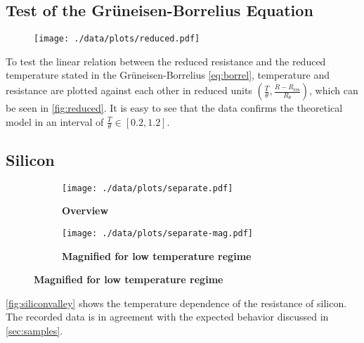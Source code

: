 \subsection{Test of the Grüneisen-Borrelius Equation}
\begin{figure}
	\centering
	\texttt{[image: ./data/plots/reduced.pdf]}
	\label{fig:reduced}
\end{figure}

To test the linear relation between the reduced resistance and the reduced temperature stated in the Grüneisen-Borrelius \autoref{eq:borrel}, temperature and resistance are plotted against each other in reduced units $\left(\frac{T}{\theta}, \frac{R-R_\text{res}}{R_\theta}\right)$, which can be seen in \autoref{fig:reduced}.
It is easy to see that the data confirms the theoretical model in an interval of $\frac{T}{\theta}\in [0.2, 1.2]$.

\subsection{Silicon}
\begin{figure}
\begin{adjustwidth}{-1cm}{-1cm}
	\centering
	\begin{subfigure}{.55\textwidth}
		\centering
		\texttt{[image: ./data/plots/separate.pdf]}
		\caption{\textbf{Overview}}
	\end{subfigure}
	\hfill
	\begin{subfigure}{.55\textwidth}
		\centering
		\texttt{[image: ./data/plots/separate-mag.pdf]}
		\caption{\textbf{Magnified for low temperature regime}}
	\end{subfigure}
	\label{fig:siliconvalley}
\end{adjustwidth}
\end{figure}

\autoref{fig:siliconvalley} shows the temperature dependence of the resistance of silicon.
The recorded data is in agreement with the expected behavior discussed in \autoref{sec:samples}.

